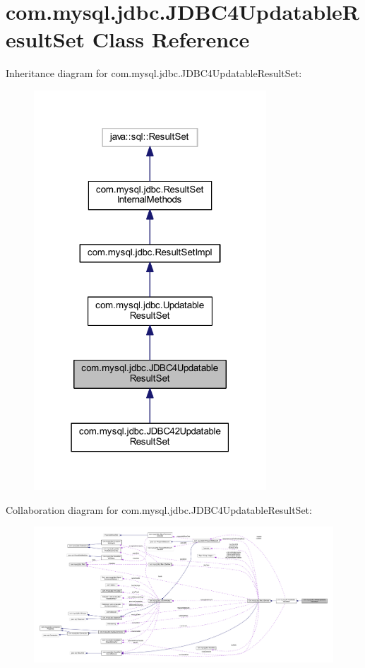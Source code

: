 \hypertarget{classcom_1_1mysql_1_1jdbc_1_1_j_d_b_c4_updatable_result_set}{}\section{com.\+mysql.\+jdbc.\+J\+D\+B\+C4\+Updatable\+Result\+Set Class Reference}
\label{classcom_1_1mysql_1_1jdbc_1_1_j_d_b_c4_updatable_result_set}


Inheritance diagram for com.\+mysql.\+jdbc.\+J\+D\+B\+C4\+Updatable\+Result\+Set\+:
\nopagebreak
\begin{figure}[H]
\begin{center}
\leavevmode
\includegraphics[width=247pt]{classcom_1_1mysql_1_1jdbc_1_1_j_d_b_c4_updatable_result_set__inherit__graph}
\end{center}
\end{figure}


Collaboration diagram for com.\+mysql.\+jdbc.\+J\+D\+B\+C4\+Updatable\+Result\+Set\+:
\nopagebreak
\begin{figure}[H]
\begin{center}
\leavevmode
\includegraphics[width=350pt]{classcom_1_1mysql_1_1jdbc_1_1_j_d_b_c4_updatable_result_set__coll__graph}
\end{center}
\end{figure}
